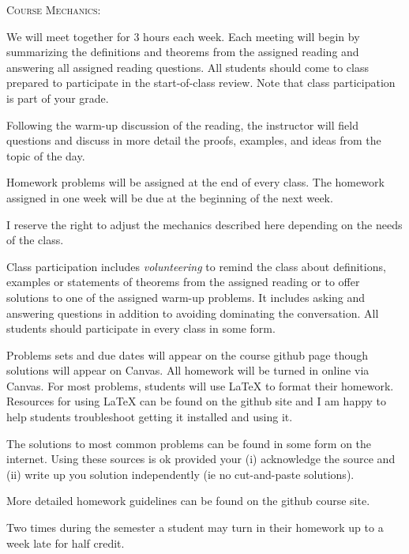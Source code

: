 \documentclass[11pt]{article}
\begin{document}
{\textsc{Course Mechanics}:}

We will meet together for 3 hours each week. Each meeting will begin by summarizing the definitions and theorems from the assigned reading and answering all assigned reading questions. All students should come to class prepared to participate in the start-of-class review. Note that class participation is part of your grade.

Following the warm-up discussion of the reading, the instructor will field questions and discuss in more detail the proofs, examples, and ideas from the topic of the day. 

Homework problems will be assigned at the end of every class. The homework assigned in one week will be due at the beginning of the next week.

I reserve the right to adjust the mechanics described here depending on the needs of the
class.\\

{}

Class participation includes \emph{volunteering} to remind the class about definitions, examples or statements of theorems from the assigned reading or to offer solutions to one of the assigned warm-up problems. It includes asking and answering questions in addition to avoiding dominating the conversation. All students should participate in every class in some form.\\

{}

Problems sets and due dates will appear on the course github page though solutions will appear on Canvas. All homework will be turned in online via Canvas. For most problems, students will use \LaTeX \: to format their homework.  Resources for using \LaTeX \: can be found on the github site and I am happy to help students troubleshoot getting it installed and using it.

The solutions to most common problems can be found in some form on the internet. Using these sources is ok provided your (i) acknowledge the source and (ii) write up you solution independently (ie no cut-and-paste solutions). 

More detailed homework guidelines can be found on the github course site.

Two times during the semester a student may turn in their homework up to a week late for half credit.\\ 

{}
\end{document}
